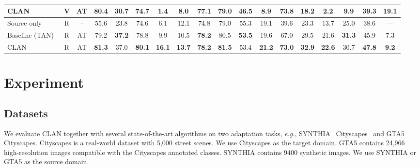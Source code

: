 \documentclass[10pt,twocolumn,letterpaper]{article}
\begin{document}
\begin{table*}[t]
\begin{center}
\begin{tabular}{l|c|c|ccccccccccccccc}
    CLAN & V & AT & \bf 80.4 & \bf 30.7 & 74.7 & \bf 1.4 & 8.0 & 77.1 & 79.0 & \bf 46.5 & \bf 8.9 & \bf 73.8 & \bf 18.2 & 2.2 & \bf 9.9 & \bf 39.3 & \bf 19.1\\
	
	\midrule
	\midrule
        
	Source only & R & - & 55.6 & 23.8 & 74.6 & 6.1 & 12.1 & 74.8 & 79.0 & 55.3 & 19.1 & 39.6 & 23.3 & 13.7 & 25.0 & 38.6 & ---\\
    
	Baseline (TAN)~\cite{tsai2018OutputSpace} & R & AT & 79.2 & \bf 37.2 & 78.8 & 9.9 & 10.5 & \bf 78.2 & 80.5 & \bf 53.5 & 19.6 & 67.0 & 29.5 & 21.6 & \bf 31.3 & 45.9 & 7.3 \\
    
	CLAN & R & AT & \bf 81.3 & 37.0 & \bf 80.1 & \bf 16.1 &	\bf 13.7 &	\bf 78.2 & \bf 81.5 & 53.4 & \bf 21.2 & \bf 73.0 & \bf 32.9 & \bf 22.6 & 30.7 & \bf 47.8 & \bf 9.2\\ 
    \bottomrule
  \end{tabular}
  \end{center}
  \label{table:synthia-cityscapes}
  \vspace{-3mm}
\end{table*}
 \section{Experiment}
\subsection{Datasets}
We evaluate CLAN together with several state-of-the-art algorithms on two adaptation tasks, \emph{e.g.}, SYNTHIA~\cite{ros2016synthia}  Cityscapes~\cite{cordts2016cityscapes} and GTA5~\cite{richter2016gta5}  Cityscapes. Cityscapes is a real-world dataset with 5,000 street scenes. We use Cityscapes as the target domain. GTA5 contains 24,966 high-resolution images compatible with the Cityscapes annotated classes. SYNTHIA contains 9400 synthetic images. We use SYNTHIA or GTA5 as the source domain. 
\end{document}
